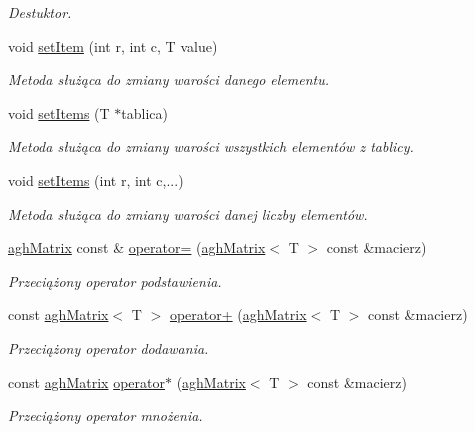 \begin{DoxyCompactItemize}
\begin{DoxyCompactList}\small\item\em Destuktor. \end{DoxyCompactList}\item 
void \hyperlink{classaghMatrix_a21c0ff1b04eb46898ec21baefe5bb575}{set\-Item} (int r, int c, T value)
\begin{DoxyCompactList}\small\item\em Metoda służąca do zmiany warości danego elementu. \end{DoxyCompactList}\item 
void \hyperlink{classaghMatrix_a13dcd86398c290fe911b83c73e32ac24}{set\-Items} (T $\ast$tablica)
\begin{DoxyCompactList}\small\item\em Metoda służąca do zmiany warości wszystkich elementów z tablicy. \end{DoxyCompactList}\item 
void \hyperlink{classaghMatrix_a6ac07da8c8a2340965f501a09ed5fcb4}{set\-Items} (int r, int c,...)
\begin{DoxyCompactList}\small\item\em Metoda służąca do zmiany warości danej liczby elementów. \end{DoxyCompactList}\item 
\hyperlink{classaghMatrix}{agh\-Matrix} const \& \hyperlink{classaghMatrix_abde1f7f5332c21ff840412fc04114a34}{operator=} (\hyperlink{classaghMatrix}{agh\-Matrix}$<$ T $>$ const \&macierz)
\begin{DoxyCompactList}\small\item\em Przeciążony operator podstawienia. \end{DoxyCompactList}\item 
const \hyperlink{classaghMatrix}{agh\-Matrix}$<$ T $>$ \hyperlink{classaghMatrix_a0d9cd6eba83f72c97b9c29f727af9f29}{operator+} (\hyperlink{classaghMatrix}{agh\-Matrix}$<$ T $>$ const \&macierz)
\begin{DoxyCompactList}\small\item\em Przeciążony operator dodawania. \end{DoxyCompactList}\item 
const \hyperlink{classaghMatrix}{agh\-Matrix} \hyperlink{classaghMatrix_a604e81dc78a1f05e4856b2a308af83bc}{operator$\ast$} (\hyperlink{classaghMatrix}{agh\-Matrix}$<$ T $>$ const \&macierz)
\begin{DoxyCompactList}\small\item\em Przeciążony operator mnożenia. \end{DoxyCompactList}\item 

\end{DoxyCompactItemize}
